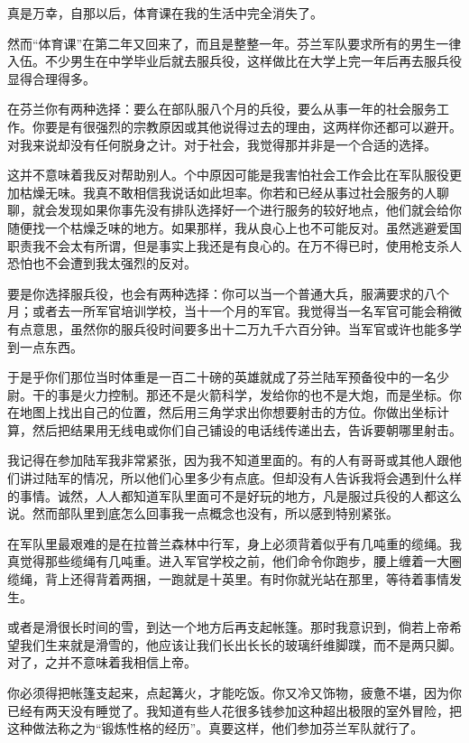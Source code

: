 真是万幸，自那以后，体育课在我的生活中完全消失了。

然而“体育课”在第二年又回来了，而且是整整一年。芬兰军队要求所有的男生一律入伍。不少男生在中学毕业后就去服兵役，这样做比在大学上完一年后再去服兵役显得合理得多。

在芬兰你有两种选择：要么在部队服八个月的兵役，要么从事一年的社会服务工作。你要是有很强烈的宗教原因或其他说得过去的理由，这两样你还都可以避开。对我来说却没有任何脱身之计。对于社会，我觉得那并非是一个合适的选择。

这并不意味着我反对帮助别人。个中原因可能是我害怕社会工作会比在军队服役更加枯燥无味。我真不敢相信我说话如此坦率。你若和已经从事过社会服务的人聊聊，就会发现如果你事先没有排队选择好一个进行服务的较好地点，他们就会给你随便找一个枯燥乏味的地方。如果那样，我从良心上也不可能反对。虽然逃避爱国职责我不会太有所谓，但是事实上我还是有良心的。在万不得已时，使用枪支杀人恐怕也不会遭到我太强烈的反对。

要是你选择服兵役，也会有两种选择：你可以当一个普通大兵，服满要求的八个月；或者去一所军官培训学校，当十一个月的军官。我觉得当一名军官可能会稍微有点意思，虽然你的服兵役时间要多出十二万九千六百分钟。当军官或许也能多学到一点东西。

于是乎你们那位当时体重是一百二十磅的英雄就成了芬兰陆军预备役中的一名少尉。干的事是火力控制。那还不是火箭科学，发给你的也不是大炮，而是坐标。你在地图上找出自己的位置，然后用三角学求出你想要射击的方位。你做出坐标计算，然后把结果用无线电或你们自己铺设的电话线传递出去，告诉要朝哪里射击。

我记得在参加陆军我非常紧张，因为我不知道里面的。有的人有哥哥或其他人跟他们讲过陆军的情况，所以他们心里多少有点底。但却没有人告诉我将会遇到什么样的事情。诚然，人人都知道军队里面可不是好玩的地方，凡是服过兵役的人都这么说。然而部队里到底怎么回事我一点概念也没有，所以感到特别紧张。

在军队里最艰难的是在拉普兰森林中行军，身上必须背着似乎有几吨重的缆绳。我真觉得那些缆绳有几吨重。进入军官学校之前，他们命令你跑步，腰上缠着一大圈缆绳，背上还得背着两捆，一跑就是十英里。有时你就光站在那里，等待着事情发生。

或者是滑很长时间的雪，到达一个地方后再支起帐篷。那时我意识到，倘若上帝希望我们生来就是滑雪的，他应该让我们长出长长的玻璃纤维脚蹼，而不是两只脚。对了，之并不意味着我相信上帝。

你必须得把帐篷支起来，点起篝火，才能吃饭。你又冷又饰物，疲惫不堪，因为你已经有两天没有睡觉了。我知道有些人花很多钱参加这种超出极限的室外冒险，把这种做法称之为“锻炼性格的经历”。真要这样，他们参加芬兰军队就行了。

